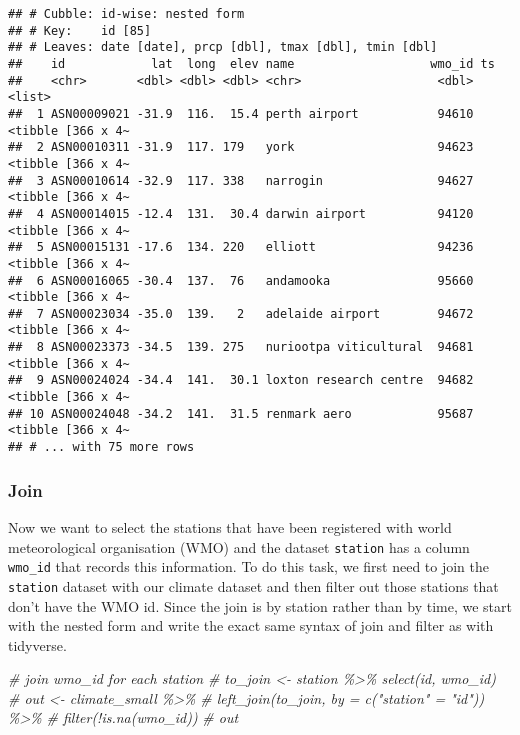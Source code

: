 \documentclass{article}
\newenvironment{Shaded}{\begin{snugshade}}{\end{snugshade}}
\newcommand{\CommentTok}[1]{\textcolor[rgb]{0.56,0.35,0.01}{\textit{#1}}}
\begin{document}
\begin{verbatim}
## # Cubble: id-wise: nested form
## # Key:    id [85]
## # Leaves: date [date], prcp [dbl], tmax [dbl], tmin [dbl]
##    id            lat  long  elev name                   wmo_id ts               
##    <chr>       <dbl> <dbl> <dbl> <chr>                   <dbl> <list>           
##  1 ASN00009021 -31.9  116.  15.4 perth airport           94610 <tibble [366 x 4~
##  2 ASN00010311 -31.9  117. 179   york                    94623 <tibble [366 x 4~
##  3 ASN00010614 -32.9  117. 338   narrogin                94627 <tibble [366 x 4~
##  4 ASN00014015 -12.4  131.  30.4 darwin airport          94120 <tibble [366 x 4~
##  5 ASN00015131 -17.6  134. 220   elliott                 94236 <tibble [366 x 4~
##  6 ASN00016065 -30.4  137.  76   andamooka               95660 <tibble [366 x 4~
##  7 ASN00023034 -35.0  139.   2   adelaide airport        94672 <tibble [366 x 4~
##  8 ASN00023373 -34.5  139. 275   nuriootpa viticultural  94681 <tibble [366 x 4~
##  9 ASN00024024 -34.4  141.  30.1 loxton research centre  94682 <tibble [366 x 4~
## 10 ASN00024048 -34.2  141.  31.5 renmark aero            95687 <tibble [366 x 4~
## # ... with 75 more rows
\end{verbatim}

\hypertarget{join}{%
\subsubsection{Join}\label{join}}

Now we want to select the stations that have been registered with world
meteorological organisation (WMO) and the dataset \texttt{station} has a
column \texttt{wmo\_id} that records this information. To do this task,
we first need to join the \texttt{station} dataset with our climate
dataset and then filter out those stations that don't have the WMO id.
Since the join is by station rather than by time, we start with the
nested form and write the exact same syntax of join and filter as with
tidyverse.

\begin{Shaded}
\begin{Highlighting}[]
\CommentTok{\# join wmo\_id for each station}
\CommentTok{\# to\_join \textless{}{-} station \%\textgreater{}\% select(id, wmo\_id)}
\CommentTok{\# out \textless{}{-} climate\_small \%\textgreater{}\% }
\CommentTok{\#   left\_join(to\_join, by = c("station" = "id")) \%\textgreater{}\% }
\CommentTok{\#   filter(!is.na(wmo\_id))}
\CommentTok{\# out}
\end{Highlighting}
\end{Shaded}
\end{document}
